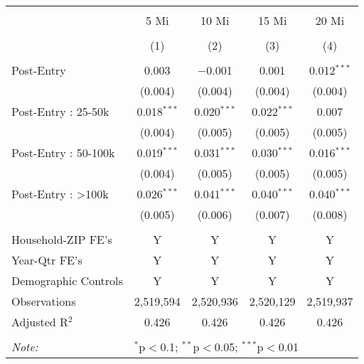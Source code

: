 
\begin{table}[!htbp] \centering 
  \caption{} 
  \label{} 
\begin{tabular}{@{\extracolsep{5pt}}lcccc} 
\\[-1.8ex]\hline 
\hline \\[-1.8ex] 
 & 5 Mi & 10 Mi & 15 Mi & 20 Mi \\ 
\\[-1.8ex] & (1) & (2) & (3) & (4)\\ 
\hline \\[-1.8ex] 
 Post-Entry & 0.003 & $-$0.001 & 0.001 & 0.012$^{***}$ \\ 
  & (0.004) & (0.004) & (0.004) & (0.004) \\ 
  Post-Entry : 25-50k & 0.018$^{***}$ & 0.020$^{***}$ & 0.022$^{***}$ & 0.007 \\ 
  & (0.004) & (0.005) & (0.005) & (0.005) \\ 
  Post-Entry : 50-100k & 0.019$^{***}$ & 0.031$^{***}$ & 0.030$^{***}$ & 0.016$^{***}$ \\ 
  & (0.004) & (0.005) & (0.005) & (0.005) \\ 
  Post-Entry : >100k & 0.026$^{***}$ & 0.041$^{***}$ & 0.040$^{***}$ & 0.040$^{***}$ \\ 
  & (0.005) & (0.006) & (0.007) & (0.008) \\ 
 \hline \\[-1.8ex] 
Household-ZIP FE's & Y & Y & Y & Y \\ 
Year-Qtr FE's & Y & Y & Y & Y \\ 
Demographic Controls & Y & Y & Y & Y \\ 
Observations & 2,519,594 & 2,520,936 & 2,520,129 & 2,519,937 \\ 
Adjusted R$^{2}$ & 0.426 & 0.426 & 0.426 & 0.426 \\ 
\hline 
\hline \\[-1.8ex] 
\textit{Note:}  & \multicolumn{4}{l}{$^{*}$p$<$0.1; $^{**}$p$<$0.05; $^{***}$p$<$0.01} \\ 
\end{tabular} 
\end{table} 
